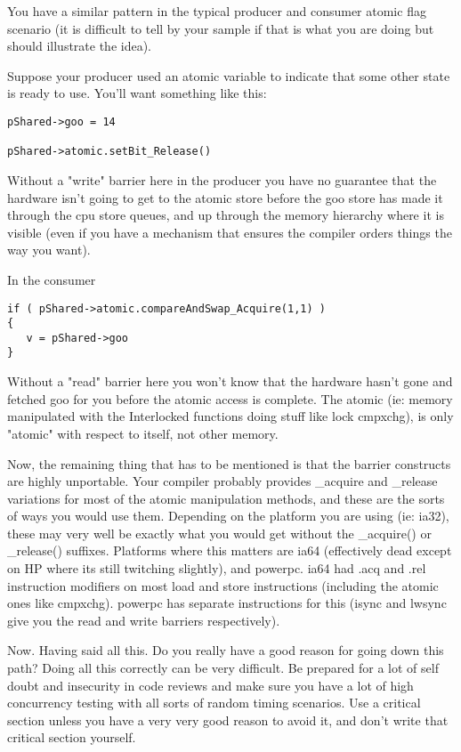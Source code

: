 You have a similar pattern in the typical producer and consumer atomic flag scenario (it is difficult to tell by your sample if that is what you are doing but should illustrate the idea).

Suppose your producer used an atomic variable to indicate that some other state is ready to use. You'll want something like this:

\begin{lstlisting}
pShared->goo = 14

pShared->atomic.setBit_Release()
\end{lstlisting}

Without a "write" barrier here in the producer you have no guarantee that the hardware isn't going to get to the atomic store before the goo store has made it through the cpu store queues, and up through the memory hierarchy where it is visible (even if you have a mechanism that ensures the compiler orders things the way you want).

In the consumer

\begin{lstlisting}
if ( pShared->atomic.compareAndSwap_Acquire(1,1) )
{
   v = pShared->goo 
}
\end{lstlisting}

Without a "read" barrier here you won't know that the hardware hasn't gone and fetched goo for you before the atomic access is complete. The atomic (ie: memory manipulated with the Interlocked functions doing stuff like lock cmpxchg), is only "atomic" with respect to itself, not other memory.

Now, the remaining thing that has to be mentioned is that the barrier constructs are highly unportable. Your compiler probably provides \_acquire and \_release variations for most of the atomic manipulation methods, and these are the sorts of ways you would use them. Depending on the platform you are using (ie: ia32), these may very well be exactly what you would get without the \_acquire() or \_release() suffixes. Platforms where this matters are ia64 (effectively dead except on HP where its still twitching slightly), and powerpc. ia64 had .acq and .rel instruction modifiers on most load and store instructions (including the atomic ones like cmpxchg). powerpc has separate instructions for this (isync and lwsync give you the read and write barriers respectively).

Now. Having said all this. Do you really have a good reason for going down this path? Doing all this correctly can be very difficult. Be prepared for a lot of self doubt and insecurity in code reviews and make sure you have a lot of high concurrency testing with all sorts of random timing scenarios. Use a critical section unless you have a very very good reason to avoid it, and don't write that critical section yourself.


\EndArticle
